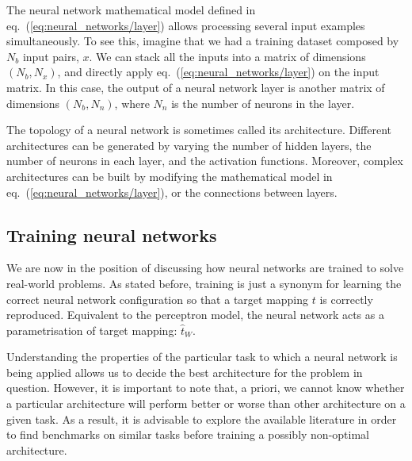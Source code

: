 The neural network mathematical model defined in eq.~(\ref{eq:neural_networks/layer}) allows
processing several input examples simultaneously. To see this, imagine that we had a training
dataset composed by $N_b$ input pairs, $x$. We can stack all the inputs into a matrix of dimensions
$(N_b, N_x)$, and directly apply eq.~(\ref{eq:neural_networks/layer}) on the input matrix. In this
case, the output of a neural network layer is another matrix of dimensions $(N_b, N_n)$, where $N_n$
is the number of neurons in the layer.
 
The topology of a neural network is sometimes called its architecture. Different architectures can
be generated by varying the number of hidden layers, the number of neurons in each layer, and the
activation functions. Moreover, complex architectures can be built by modifying the mathematical
model in eq.~(\ref{eq:neural_networks/layer}), or the connections between layers.
 
\subsection{Training neural networks}
We are now in the position of discussing how neural networks are trained to solve real-world
problems. As stated before, training is just a synonym for learning the correct neural network
configuration so that a target mapping $t$ is correctly reproduced. Equivalent to the perceptron
model, the neural network acts as a parametrisation of target mapping: $\hat{t}_W$.

Understanding the properties of the particular task to which a neural network is being applied
allows us to decide the best architecture for the problem in question. However, it is important to
note that, a priori, we cannot know whether a particular architecture will perform better or worse
than other architecture on a given task. As a result, it is advisable to explore the available
literature in order to find benchmarks on similar tasks before training a possibly non-optimal
architecture.

